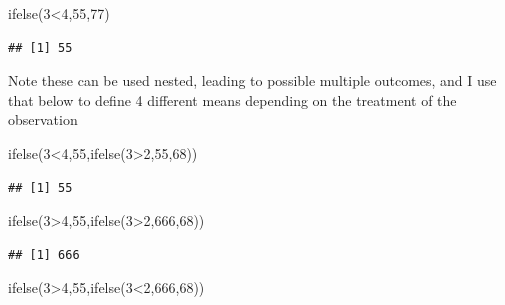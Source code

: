 \documentclass[
]{book}
\newenvironment{Shaded}{\begin{snugshade}}{\end{snugshade}}
\newcommand{\DecValTok}[1]{\textcolor[rgb]{0.00,0.00,0.81}{#1}}
\newcommand{\FunctionTok}[1]{\textcolor[rgb]{0.00,0.00,0.00}{#1}}
\newcommand{\NormalTok}[1]{#1}
\newcommand{\SpecialCharTok}[1]{\textcolor[rgb]{0.00,0.00,0.00}{#1}}
\begin{document}
\begin{Shaded}
\begin{Highlighting}[]
\FunctionTok{ifelse}\NormalTok{(}\DecValTok{3}\SpecialCharTok{\textless{}}\DecValTok{4}\NormalTok{,}\DecValTok{55}\NormalTok{,}\DecValTok{77}\NormalTok{)}
\end{Highlighting}
\end{Shaded}

\begin{verbatim}
## [1] 55
\end{verbatim}

Note these can be used nested, leading to possible multiple outcomes, and I use that below to define 4 different means depending on the treatment of the observation

\begin{Shaded}
\begin{Highlighting}[]
\FunctionTok{ifelse}\NormalTok{(}\DecValTok{3}\SpecialCharTok{\textless{}}\DecValTok{4}\NormalTok{,}\DecValTok{55}\NormalTok{,}\FunctionTok{ifelse}\NormalTok{(}\DecValTok{3}\SpecialCharTok{\textgreater{}}\DecValTok{2}\NormalTok{,}\DecValTok{55}\NormalTok{,}\DecValTok{68}\NormalTok{))}
\end{Highlighting}
\end{Shaded}

\begin{verbatim}
## [1] 55
\end{verbatim}

\begin{Shaded}
\begin{Highlighting}[]
\FunctionTok{ifelse}\NormalTok{(}\DecValTok{3}\SpecialCharTok{\textgreater{}}\DecValTok{4}\NormalTok{,}\DecValTok{55}\NormalTok{,}\FunctionTok{ifelse}\NormalTok{(}\DecValTok{3}\SpecialCharTok{\textgreater{}}\DecValTok{2}\NormalTok{,}\DecValTok{666}\NormalTok{,}\DecValTok{68}\NormalTok{))}
\end{Highlighting}
\end{Shaded}

\begin{verbatim}
## [1] 666
\end{verbatim}

\begin{Shaded}
\begin{Highlighting}[]
\FunctionTok{ifelse}\NormalTok{(}\DecValTok{3}\SpecialCharTok{\textgreater{}}\DecValTok{4}\NormalTok{,}\DecValTok{55}\NormalTok{,}\FunctionTok{ifelse}\NormalTok{(}\DecValTok{3}\SpecialCharTok{\textless{}}\DecValTok{2}\NormalTok{,}\DecValTok{666}\NormalTok{,}\DecValTok{68}\NormalTok{))}
\end{Highlighting}
\end{Shaded}
\end{document}
